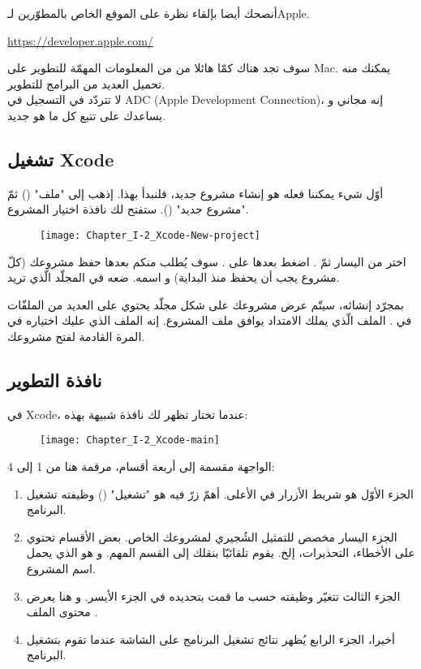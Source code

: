 أنصحك أيضا بإلقاء نظرة على الموقع الخاص بالمطوّرين لـ\textenglish{Apple}.

\url{https://developer.apple.com/}

سوف تجد هناك كمّا هائلا من من المعلومات المهمّة للتطوير على
\textenglish{Mac}.
يمكنك منه تحميل العديد من البرامج للتطوير.\\
لا تتردّد في التسجيل في
\textenglish{ADC} (\textenglish{Apple Development Connection})،
إنه مجاني و يساعدك على تتبع كل ما هو جديد.

\subsection{تشغيل \textenglish{Xcode}}

أوّل شيء يمكننا فعله هو إنشاء مشروع جديد، فلنبدأ بهذا. إذهب إلى
"ملف"
()
ثمّ
"مشروع جديد"
().
ستفتح لك نافذة اختيار المشروع.

\begin{figure}[H]
	\centering
	\texttt{[image: Chapter\_I-2\_Xcode-New-project]}
\end{figure}

اختر
من اليسار ثمّ
.
اضغط بعدها على
.
سوف يُطلب منكم بعدها حفظ مشروعك (كلّ مشروع يجب أن يحفظ منذ البداية) و اسمه. ضعه في المجلّد الّذي تريد.

بمجرّد إنشائه، سيتّم عرض مشروعك على شكل مجلّد يحتوي على العديد من الملفّات في .
الملف الّذي يملك الامتداد
يوافق ملف المشروع. إنه الملف الذي عليك اختياره في المرة القادمة لفتح مشروعك.

\subsection{نافذة التطوير}

في
\textenglish{Xcode}،
عندما تختار
تظهر لك نافذة شبيهة بهذه:

\begin{figure}[H]
	\centering
	\texttt{[image: Chapter\_I-2\_Xcode-main]}
\end{figure}

الواجهة مقسمة إلى أربعة أقسام، مرقمة هنا من 1 إلى 4:

\begin{enumerate}
  \item الجزء الأوّل هو شريط الأزرار في الأعلى. أهمّ زرّ فيه هو
"تشغيل"
()
وظيفته تشغيل البرنامج.
  \item الجزء اليسار مخصص للتمثيل الشُجيري لمشروعك الخاص. بعض الأقسام تحتوي على الأخطاء، التحذيرات، إلخ. يقوم
تلقائيّا بنقلك إلى القسم المهم. و هو الذي يحمل اسم المشروع.
  \item الجزء الثالث تتغيّر وظيفته حسب ما قمت بتحديده في الجزء الأيسر. و هنا يعرض محتوى الملف
.
  \item أخيرا، الجزء الرابع يُظهر نتائج تشغيل البرنامج على الشاشة عندما تقوم بتشغيل البرنامج.
\end{enumerate}

